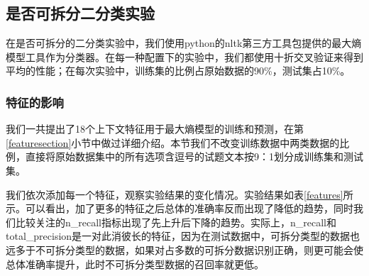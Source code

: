 \documentclass[master, winfont]{njuthesis}
\begin{document}
\subsection{是否可拆分二分类实验}
在是否可拆分的二分类实验中，我们使用python的nltk第三方工具包提供的最大熵模型工具作为分类器。在每一种配置下的实验中，我们都使用十折交叉验证来得到平均的性能；在每次实验中，训练集的比例占原始数据的90\%，测试集占10\%。

\subsubsection{特征的影响}
我们一共提出了18个上下文特征用于最大熵模型的训练和预测，在第\ref{featuresection}小节中做过详细介绍。本节我们不改变训练数据中两类数据的比例，直接将原始数据集中的所有选项含逗号的试题文本按9：1划分成训练集和测试集。

我们依次添加每一个特征，观察实验结果的变化情况。实验结果如表\ref{features}所示。可以看出，加了更多的特征之后总体的准确率反而出现了降低的趋势，同时我们比较关注的n\_recall指标出现了先上升后下降的趋势。实际上，n\_recall和total\_precision是一对此消彼长的特征，因为在测试数据中，可拆分类型的数据也远多于不可拆分类型的数据，如果对占多数的可拆分数据识别正确，则更可能会使总体准确率提升，此时不可拆分类型数据的召回率就更低。
\end{document}
